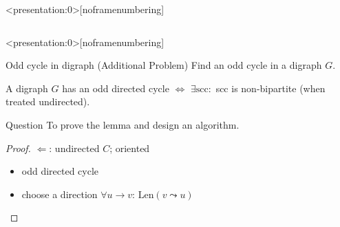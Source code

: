 \begin{frame}<presentation:0>[noframenumbering]
  \begin{columns}
      \pause
  \end{columns}
\end{frame}
\begin{frame}<presentation:0>[noframenumbering]
  \begin{exampleblock}{Odd cycle in digraph (Additional Problem)}
    Find an odd cycle in a digraph $G$.
  \end{exampleblock}

  \pause
  \begin{lemma}
    A digraph $G$ has an odd directed cycle $\iff$ $\exists \text{scc}: $ scc is non-bipartite (when treated undirected).
  \end{lemma}

  \pause
  \begin{alertblock}{Question}
	To prove the lemma and design an algorithm.
  \end{alertblock}
  \begin{proof}
    $\Longleftarrow$: undirected $C$; oriented
      \begin{itemize}
    	\item odd directed cycle
    	\item choose a direction $\forall u \to v$: $\text{Len}(v \leadsto u)$ 
      \end{itemize}
  \end{proof}
\end{frame}
